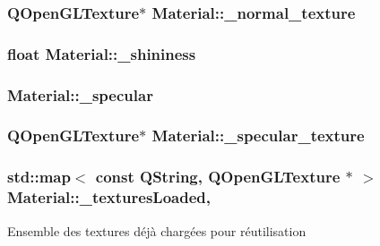 \hypertarget{class_material_add78622071d92485dd37dbd1934453b3}{
\subsubsection[{\+\_\+normal\+\_\+texture}]{\setlength{\rightskip}{0pt plus 5cm}Q\+Open\+G\+L\+Texture$\ast$ Material\+::\+\_\+normal\+\_\+texture\hspace{0.3cm}{\ttfamily [private]}}}\label{class_material_add78622071d92485dd37dbd1934453b3}
\hypertarget{class_material_ae3f666b9de93b770232ebb5b1b3ee47e}{
\subsubsection[{\+\_\+shininess}]{\setlength{\rightskip}{0pt plus 5cm}float Material\+::\+\_\+shininess\hspace{0.3cm}{\ttfamily [private]}}}\label{class_material_ae3f666b9de93b770232ebb5b1b3ee47e}
\hypertarget{class_material_af3e2839f5a712fba28111e00783af70f}{
\subsubsection[{\+\_\+specular}]{ Material\+::\+\_\+specular\hspace{0.3cm}{\ttfamily [private]}}}\label{class_material_af3e2839f5a712fba28111e00783af70f}
\hypertarget{class_material_a15711d6d794b6ea122e38738fa73ba8a}{
\subsubsection[{\+\_\+specular\+\_\+texture}]{\setlength{\rightskip}{0pt plus 5cm}Q\+Open\+G\+L\+Texture$\ast$ Material\+::\+\_\+specular\+\_\+texture\hspace{0.3cm}{\ttfamily [private]}}}\label{class_material_a15711d6d794b6ea122e38738fa73ba8a}
\hypertarget{class_material_a9ccbb6b22b224284050b4d6c172829fc}{
\subsubsection[{\+\_\+textures\+Loaded}]{\setlength{\rightskip}{0pt plus 5cm}std\+::map$<$ const Q\+String, Q\+Open\+G\+L\+Texture $\ast$ $>$ Material\+::\+\_\+textures\+Loaded\hspace{0.3cm}{\ttfamily [static]}, {\ttfamily [private]}}}\label{class_material_a9ccbb6b22b224284050b4d6c172829fc}
Ensemble des textures déjà chargées pour réutilisation 

